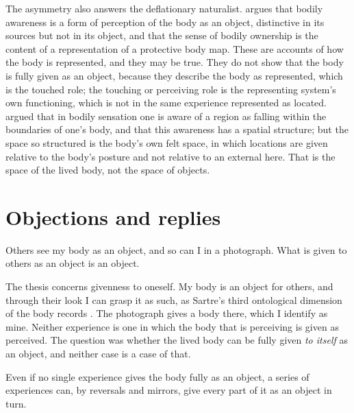 \documentclass{situationist-preprint}
\begin{document}
The asymmetry also answers the deflationary naturalist. \citet{Bermudez1998} argues that bodily awareness is a form of perception of the body as an object, distinctive in its sources but not in its object, and \citet{deVignemont2018} that the sense of bodily ownership is the content of a representation of a protective body map. These are accounts of how the body is represented, and they may be true. They do not show that the body is fully given as an object, because they describe the body as represented, which is the touched role; the touching or perceiving role is the representing system's own functioning, which is not in the same experience represented as located. \citet{Martin1995} argued that in bodily sensation one is aware of a region as falling within the boundaries of one's body, and that this awareness has a spatial structure; but the space so structured is the body's own felt space, in which locations are given relative to the body's posture and not relative to an external here. That is the space of the lived body, not the space of objects.

\section{Objections and replies}

\begin{objection}\label{o:third}
Others see my body as an object, and so can I in a photograph. What is given to others as an object is an object.
\end{objection}

\begin{reply}
The thesis concerns givenness to oneself. My body is an object for others, and through their look I can grasp it as such, as Sartre's third ontological dimension of the body records \citep[Part~III, ch.~2]{Sartre1943}. The photograph gives a body there, which I identify as mine. Neither experience is one in which the body that is perceiving is given as perceived. The question was whether the lived body can be fully given \emph{to itself} as an object, and neither case is a case of that.
\end{reply}

\begin{objection}\label{o:succ}
Even if no single experience gives the body fully as an object, a series of experiences can, by reversals and mirrors, give every part of it as an object in turn.
\end{objection}
\end{document}

